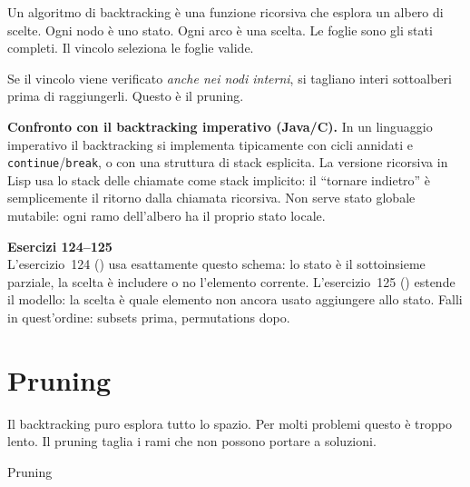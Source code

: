 \begin{intuizione}
Un algoritmo di backtracking è una funzione ricorsiva
che esplora un albero di scelte.
Ogni nodo è uno stato. Ogni arco è una scelta.
Le foglie sono gli stati completi. Il vincolo seleziona
le foglie valide.

\medskip
Se il vincolo viene verificato \emph{anche nei nodi interni},
si tagliano interi sottoalberi prima di raggiungerli.
Questo è il pruning.
\end{intuizione}

\begin{confronto}
\textbf{Confronto con il backtracking imperativo (Java/C).}
In un linguaggio imperativo il backtracking si implementa
tipicamente con cicli annidati e \texttt{continue}/\texttt{break},
o con una struttura di stack esplicita.
La versione ricorsiva in Lisp usa lo stack delle chiamate
come stack implicito: il ``tornare indietro'' è semplicemente
il ritorno dalla chiamata ricorsiva.
Non serve stato globale mutabile: ogni ramo dell'albero
ha il proprio stato locale.
\end{confronto}

\begin{workbook}
\textbf{Esercizi 124--125}\\[4pt]
L'esercizio~124 () usa esattamente questo schema:
lo stato è il sottoinsieme parziale, la scelta è includere o no
l'elemento corrente.
L'esercizio~125 () estende il modello:
la scelta è quale elemento non ancora usato aggiungere allo stato.
Falli in quest'ordine: subsets prima, permutations dopo.
\end{workbook}

\section{Pruning}

Il backtracking puro esplora tutto lo spazio.
Per molti problemi questo è troppo lento.
Il pruning taglia i rami che non possono portare a soluzioni.

\begin{concetto}{Pruning}

\boxsep
{}
\end{concetto}

